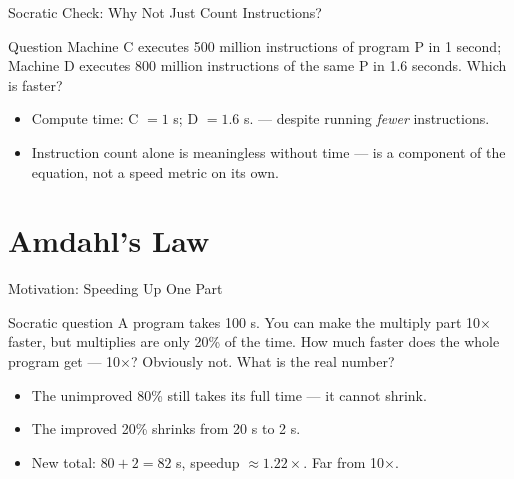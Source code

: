 \documentclass[aspectratio=169]{beamer}
\begin{document}
\begin{frame}{Socratic Check: Why Not Just Count Instructions?}
  \begin{alertblock}{Question}
    Machine C executes 500 million instructions of program P in 1 second;
    Machine D executes 800 million instructions of the same P in 1.6 seconds.
    Which is faster?
  \end{alertblock}
  \begin{itemize}
    \item Compute time: C $= 1$ s; D $= 1.6$ s.  --- despite
      running \emph{fewer} instructions.
    \item Instruction count alone is meaningless without time ---  is a
      component of the equation, not a speed metric on its own.
  \end{itemize}
\end{frame}


\section{Amdahl's Law}

\begin{frame}{Motivation: Speeding Up One Part}
  \begin{block}{Socratic question}
    A program takes 100 s. You can make the multiply part 10$\times$ faster,
    but multiplies are only 20\% of the time. How much faster does the whole
    program get --- 10$\times$? Obviously not. What is the real number?
  \end{block}
  \begin{itemize}
    \item The unimproved 80\% still takes its full time --- it cannot shrink.
    \item The improved 20\% shrinks from 20 s to 2 s.
    \item New total: $80 + 2 = 82$ s, speedup $\approx 1.22\times$. Far from
      10$\times$.
  \end{itemize}
\end{frame}
\end{document}
